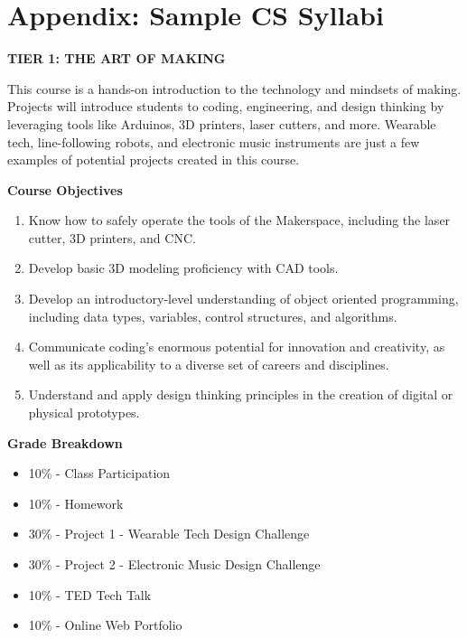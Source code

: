
\chapter{Appendix: Sample CS Syllabi} %

\label{AppendixCC} %


{\large \textbf{TIER 1: THE ART OF MAKING}}\par
This course is a hands-on introduction to the technology and mindsets of making. Projects will introduce students to coding, engineering, and design thinking by leveraging tools like Arduinos, 3D printers, laser cutters, and more. Wearable tech, line-following robots, and electronic music instruments are just a few examples of potential projects created in this course.\par

\textbf{Course Objectives}
\begin{enumerate}
	\item Know how to safely operate the tools of the Makerspace, including the laser cutter, 3D printers, and CNC.
	\item Develop basic 3D modeling proficiency with CAD tools.
	\item Develop an introductory-level understanding of object oriented programming, including data types, variables, control structures, and algorithms.
	\item Communicate coding’s enormous potential for innovation and creativity, as well as its applicability to a diverse set of careers and disciplines.
	\item Understand and apply design thinking principles in the creation of digital or physical prototypes.
\end{enumerate} \par

\textbf{Grade Breakdown}
\begin{itemize}
	\item 10\% - Class Participation
	\item 10\% - Homework
	\item 30\% - Project 1 - Wearable Tech Design Challenge
	\item 30\% - Project 2 - Electronic Music Design Challenge
	\item 10\% - TED Tech Talk
	\item 10\% - Online Web Portfolio
\end{itemize} \par

